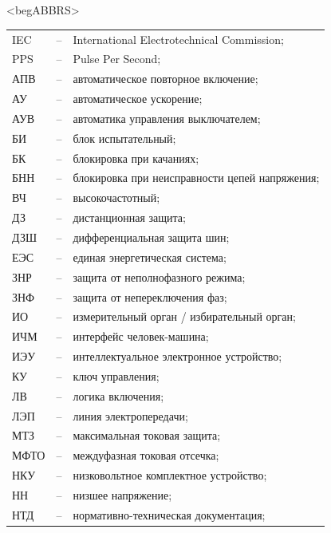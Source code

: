 \color{unimain}\section*{}
{\color{white}\fontsize{0.1pt}{0.1pt}\selectfont<begABBRS>}
\color{black}
\begin{longtable}{>{\raggedright\arraybackslash}m{2cm}>{\raggedright\arraybackslash}m{0.5cm}>{\raggedright\arraybackslash}m{20cm}}
\endfirsthead\endhead\endfoot\endlastfoot
IEC & -- &  International Electrotechnical Commission; \\
PPS & -- & Pulse Per Second; \\
АПВ & -- & автоматическое повторное включение; \\
АУ & -- & автоматическое ускорение; \\
АУВ & -- & автоматика управления выключателем; \\
БИ & -- & блок испытательный; \\
БК & -- & блокировка при качаниях; \\
БНН & -- & блокировка при неисправности цепей напряжения; \\
ВЧ & -- & высокочастотный; \\
ДЗ & -- & дистанционная защита; \\
ДЗШ & -- & дифференциальная защита шин; \\
ЕЭС & -- & единая энергетическая система; \\
ЗНР & -- & защита от неполнофазного режима; \\
ЗНФ & -- & защита от непереключения фаз; \\
ИО & -- & измерительный орган / избирательный орган; \\
ИЧМ & -- & интерфейс человек-машина; \\
ИЭУ & -- & интеллектуальное электронное устройство; \\
КУ & -- & ключ управления; \\
ЛВ & -- & логика включения; \\
ЛЭП & -- & линия электропередачи; \\
МТЗ & -- & максимальная токовая защита; \\
МФТО & -- & междуфазная токовая отсечка; \\
НКУ & -- & низковольтное комплектное устройство; \\
НН & -- & низшее напряжение; \\
НТД & -- & нормативно-техническая документация; \\

\end{longtable}
